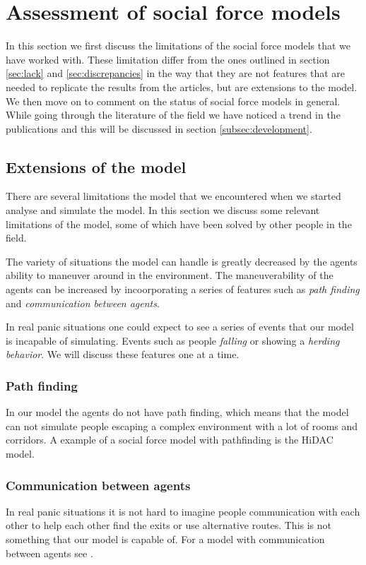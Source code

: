 \section{Assessment of social force models}
\label{sec:assessment}
In this section we first discuss the limitations of the social force models 
that we have worked with. These limitation differ from the ones outlined in 
section \ref{sec:lack} and \ref{sec:discrepancies} in the way that 
they are not features that are needed to replicate the results from the articles, 
but are extensions to the model. We then move on to comment on the status of 
social force models in general.
While going through the literature of the field we have noticed a trend in the 
publications and this will be discussed in section \ref{subsec:development}.

\subsection{Extensions of the model}
There are several limitations the model that we encountered when we started 
analyse and simulate the model. In this section we discuss some relevant 
limitations of the model, some of which have been solved by other people in the 
field. 

The variety of situations the model can handle is greatly decreased by the 
agents ability to maneuver around in the environment. The maneuverability of 
the agents can be increased by incoorporating a series of features such as 
\emph{path finding} and \emph{communication between agents}. 

In real panic situations one could expect to see a series of events that our 
model is incapable of simulating. Events such as people \emph{falling} or showing a 
\emph{herding behavior}. We will discuss these features one at a time.

\subsubsection{Path finding}
In our model the agents do not have path finding, which means that the model 
can not simulate people escaping a complex environment with a lot of rooms 
and corridors. A example of a social force model with pathfinding is the HiDAC 
model\cite{HiDAC}.

\subsubsection{Communication between agents}
In real panic situations it is not hard to imagine people communication with 
each other to help each other find the exits or use alternative routes. This is 
not something that our model is capable of. For a model with communication between 
agents see \cite{HiDAC}.

